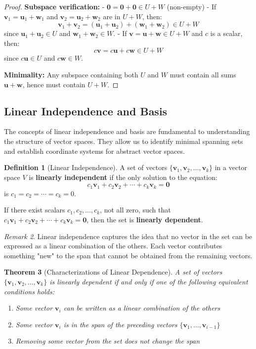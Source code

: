 \documentclass[12pt]{article}
\numberwithin{equation}{section}
\newcommand{\vect}[1]{\boldsymbol{#1}}   %
\theoremstyle{plain}
\newtheorem{theorem}{Theorem}[section]
\theoremstyle{definition}
\newtheorem{definition}[theorem]{Definition}
\theoremstyle{remark}
\newtheorem{remark}[theorem]{Remark}
\begin{document}
\begin{proof}
\textbf{Subspace verification:}
- $\vect{0} = \vect{0} + \vect{0} \in U + W$ (non-empty)
- If $\vect{v}_1 = \vect{u}_1 + \vect{w}_1$ and $\vect{v}_2 = \vect{u}_2 + \vect{w}_2$ are in $U + W$, then:
  $$\vect{v}_1 + \vect{v}_2 = (\vect{u}_1 + \vect{u}_2) + (\vect{w}_1 + \vect{w}_2) \in U + W$$
  since $\vect{u}_1 + \vect{u}_2 \in U$ and $\vect{w}_1 + \vect{w}_2 \in W$.
- If $\vect{v} = \vect{u} + \vect{w} \in U + W$ and $c$ is a scalar, then:
  $$c\vect{v} = c\vect{u} + c\vect{w} \in U + W$$
  since $c\vect{u} \in U$ and $c\vect{w} \in W$.

\textbf{Minimality:} Any subspace containing both $U$ and $W$ must contain all sums $\vect{u} + \vect{w}$, hence must contain $U + W$.
\end{proof}

\subsection{Linear Independence and Basis}

The concepts of linear independence and basis are fundamental to understanding the structure of vector spaces. They allow us to identify minimal spanning sets and establish coordinate systems for abstract vector spaces.

\begin{definition}[Linear Independence]
A set of vectors $\{\vect{v}_1, \vect{v}_2, \ldots, \vect{v}_k\}$ in a vector space $V$ is \textbf{linearly independent} if the only solution to the equation:
$$c_1\vect{v}_1 + c_2\vect{v}_2 + \cdots + c_k\vect{v}_k = \vect{0}$$
is $c_1 = c_2 = \cdots = c_k = 0$.

If there exist scalars $c_1, c_2, \ldots, c_k$, not all zero, such that $c_1\vect{v}_1 + c_2\vect{v}_2 + \cdots + c_k\vect{v}_k = \vect{0}$, then the set is \textbf{linearly dependent}.
\end{definition}

\begin{remark}
Linear independence captures the idea that no vector in the set can be expressed as a linear combination of the others. Each vector contributes something "new" to the span that cannot be obtained from the remaining vectors.
\end{remark}

\begin{theorem}[Characterizations of Linear Dependence]
A set of vectors $\{\vect{v}_1, \vect{v}_2, \ldots, \vect{v}_k\}$ is linearly dependent if and only if one of the following equivalent conditions holds:
\begin{enumerate}
\item Some vector $\vect{v}_i$ can be written as a linear combination of the others
\item Some vector $\vect{v}_i$ is in the span of the preceding vectors $\{\vect{v}_1, \ldots, \vect{v}_{i-1}\}$
\item Removing some vector from the set does not change the span
\end{enumerate}
\end{theorem}
\end{document}
